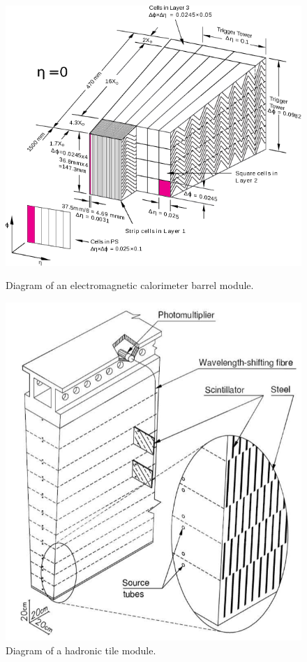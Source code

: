 \begin{figure}[h]
\begin{minipage}[b]{0.48\textwidth}
\includegraphics[width=\textwidth]{fig/atlas/caloModule.png}
\caption{Diagram of an electromagnetic calorimeter barrel module\cite{cern-jinst-atlas}.}
\label{fig:caloModule}
\end{minipage}
\hfill
\begin{minipage}[b]{0.48\textwidth}
\includegraphics[width=\textwidth]{fig/atlas/tile.png}
\caption{Diagram of a hadronic tile module\cite{cern-jinst-atlas}.}
\label{fig:tileModule}
\end{minipage}
\end{figure}
